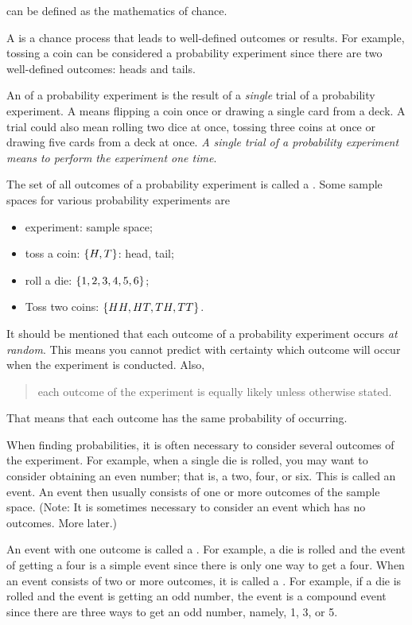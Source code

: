  can be defined as the mathematics of chance.

A  is a chance process that leads to well-defined outcomes or results. For example, tossing a coin can be considered a probability experiment since there are two well-defined outcomes: heads and tails.

An  of a probability experiment is the result of a \emph{single} trial of a probability experiment. A  means flipping a coin once or drawing a single card from a deck. A trial could also mean rolling two dice at once, tossing three coins at once or drawing five cards from a deck at once. \emph{A single trial of a probability experiment means to perform the experiment one time}.

The set of all outcomes of a probability experiment is called a . Some sample spaces for various probability experiments are
\begin{itemize}
\item experiment: sample space;
\item toss a coin: $\left\lbrace{H, T}\right\rbrace$: head, tail;
\item roll a die: $\left\lbrace{1,2,3,4,5,6}\right\rbrace$;
\item Toss two coins: $\left\lbrace{HH, HT, TH, TT}\right\rbrace$.
\end{itemize}

It should be mentioned that each outcome of a probability experiment occurs \emph{at random}. This means you cannot predict with certainty which outcome will occur when the experiment is conducted. Also, 
\begin{quote}
each outcome of the experiment is equally likely unless otherwise stated.
\end{quote}
That means that each outcome has the same probability of occurring.

When finding probabilities, it is often necessary to consider several outcomes of the experiment. For example, when a single die is rolled, you may want to consider obtaining an even number; that is, a two, four, or six. This is called an event. An event then usually consists of one or more outcomes of the sample space. (Note: It is sometimes necessary to consider an event which has no outcomes. More later.)

An event with one outcome is called a . For example, a die is rolled and the event of getting a four is a simple event since there is only one way to get a four. When an event consists of two or more outcomes, it is called a . For example, if a die is rolled and the event is getting an odd number, the event is a compound event since there are three ways to get an odd number, namely, 1, 3, or 5.

